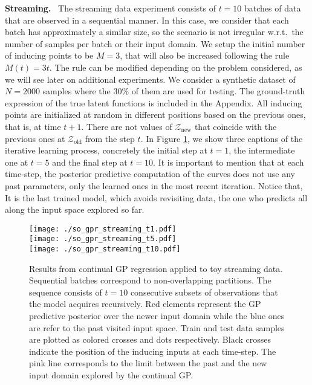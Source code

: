 \documentclass[]{article}
\newcommand{\Zcal}{\mathcal{Z}}
\begin{document}
\textbf{Streaming.}~ The streaming data experiment consists of $t=10$ batches of data that are observed in a sequential manner. In this case, we consider that each batch has approximately a similar size, so the scenario is not irregular w.r.t.\ the number of samples per batch or their input domain. We setup the initial number of inducing points to be $M=3$, that will also be increased following the rule $M(t) = 3t$. The rule can be modified depending on the problem considered, as we will see later on additional experiments. We consider a synthetic dataset of $N=2000$ samples where the $30\%$ of them are used for testing. The ground-truth expression of the true latent functions is included in the Appendix. All inducing points are initialized at random in different positions based on the previous ones, that is, at time $t+1$. There are not values of $\Zcal_{\text{new}}$ that coincide with the previous ones at $\Zcal_{\text{old}}$ from the step $t$. In Figure \ref{fig:streaming}, we show three captions of the iterative learning process, concretely the initial step at $t=1$, the intermediate one at $t=5$ and the final step at $t=10$. It is important to mention that at each time-step, the posterior predictive computation of the curves does not use any past parameters, only the learned ones in the most recent iteration. Notice that, It is the last trained model, which avoids revisiting data, the one who predicts all along the input space explored so far. 

\begin{figure}[] \centering
\texttt{[image: ./so\_gpr\_streaming\_t1.pdf]}\\
		\vspace{0.1cm}
		\texttt{[image: ./so\_gpr\_streaming\_t5.pdf]}\\
		\vspace{0.1cm}
		\texttt{[image: ./so\_gpr\_streaming\_t10.pdf]}
		\caption{Results from continual GP regression applied to toy streaming data. Sequential batches correspond to non-overlapping partitions. The sequence consists of $t=10$ consecutive subsets of observations that the model acquires recursively. Red elements represent the GP predictive posterior over the newer input domain while the blue ones are refer to the past visited input space. Train and test data samples are plotted as colored crosses and dots respectively. Black crosses indicate the position of the inducing inputs at each time-step. The pink line corresponds to the limit between the past and the new input domain explored by the continual GP.}
		\label{fig:streaming}
\end{figure}
\end{document}
